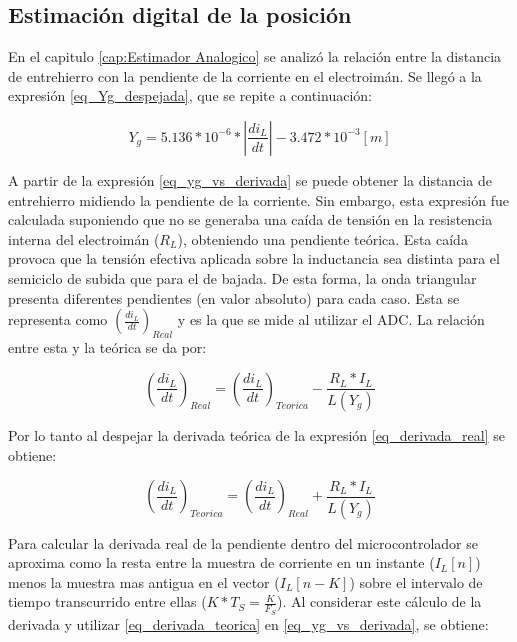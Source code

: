 

\subsection{Estimación digital de la posición}

En el capitulo \ref{cap:Estimador Analogico} se analizó la relación entre la distancia de entrehierro con la pendiente de la corriente en el electroimán. Se llegó a la expresión \ref{eq_Yg_despejada}, que se repite a continuación:

\begin{equation} \label{eq_yg_vs_derivada}
	Y_g = 5.136*10^{-6}*|\frac{di_L}{dt}|- 3.472*10^{-3} [m]
\end{equation}

A partir de la expresión \ref{eq_yg_vs_derivada} se puede obtener la distancia de entrehierro midiendo la pendiente de la corriente. Sin embargo, esta expresión fue calculada suponiendo que no se generaba una caída de tensión en la resistencia interna del electroimán ($R_L$), obteniendo una pendiente teórica. Esta caída provoca que la tensión efectiva aplicada sobre la inductancia sea distinta para el semiciclo de subida que para el de bajada. De esta forma, la onda triangular presenta diferentes pendientes (en valor absoluto) para cada caso. Esta se representa como $(\frac{di_L}{dt})_{Real}$ y es la que se mide al utilizar el ADC. La relación entre esta y la teórica se da por:

\begin{equation} \label{eq_derivada_real}
	(\frac{di_L}{dt})_{Real}=(\frac{di_L}{dt})_{Teorica}-\frac{R_L*I_L}{L(Y_g)}
\end{equation}

Por lo tanto al despejar la derivada teórica de la expresión \ref{eq_derivada_real} se obtiene:

\begin{equation} \label{eq_derivada_teorica}
	(\frac{di_L}{dt})_{Teorica}=(\frac{di_L}{dt})_{Real}+\frac{R_L*I_L}{L(Y_g)}
\end{equation}


Para calcular la derivada real de la pendiente dentro del microcontrolador se aproxima como la resta entre la muestra de corriente en un instante ($I_L[n]$) menos la muestra mas antigua en el vector ($I_L[n-K]$) sobre el intervalo de tiempo transcurrido entre ellas ($K*T_S=\frac{K}{F_S}$). Al considerar este cálculo de la derivada y utilizar \ref{eq_derivada_teorica} en \ref{eq_yg_vs_derivada}, se obtiene:

